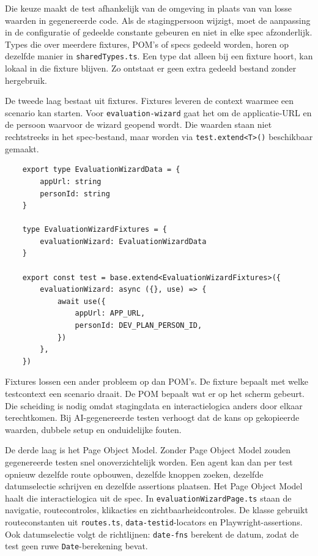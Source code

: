 Die keuze maakt de test afhankelijk van de omgeving in plaats van van losse waarden in gegenereerde code. Als de stagingpersoon wijzigt, moet de aanpassing in de configuratie of gedeelde constante gebeuren en niet in elke spec afzonderlijk. Types die over meerdere fixtures, POM's of specs gedeeld worden, horen op dezelfde manier in \texttt{sharedTypes.ts}. Een type dat alleen bij een fixture hoort, kan lokaal in die fixture blijven. Zo ontstaat er geen extra gedeeld bestand zonder hergebruik.

De tweede laag bestaat uit fixtures. Fixtures leveren de context waarmee een scenario kan starten. Voor \texttt{evaluation-wizard} gaat het om de applicatie-URL en de persoon waarvoor de wizard geopend wordt. Die waarden staan niet rechtstreeks in het spec-bestand, maar worden via \texttt{test.extend<T>()} beschikbaar gemaakt.

\begin{verbatim}
    export type EvaluationWizardData = {
        appUrl: string
        personId: string
    }
    
    type EvaluationWizardFixtures = {
        evaluationWizard: EvaluationWizardData
    }
    
    export const test = base.extend<EvaluationWizardFixtures>({
        evaluationWizard: async ({}, use) => {
            await use({
                appUrl: APP_URL,
                personId: DEV_PLAN_PERSON_ID,
            })
        },
    })
\end{verbatim}

Fixtures lossen een ander probleem op dan POM's. De fixture bepaalt met welke testcontext een scenario draait. De POM bepaalt wat er op het scherm gebeurt. Die scheiding is nodig omdat stagingdata en interactielogica anders door elkaar terechtkomen. Bij AI-gegenereerde testen verhoogt dat de kans op gekopieerde waarden, dubbele setup en onduidelijke fouten.

De derde laag is het Page Object Model. Zonder Page Object Model zouden gegenereerde testen snel onoverzichtelijk worden. Een agent kan dan per test opnieuw dezelfde route opbouwen, dezelfde knoppen zoeken, dezelfde datumselectie schrijven en dezelfde assertions plaatsen. Het Page Object Model haalt die interactielogica uit de spec. In \texttt{evaluationWizardPage.ts} staan de navigatie, routecontroles, klikacties en zichtbaarheidcontroles. De klasse gebruikt routeconstanten uit \texttt{routes.ts}, \texttt{data-testid}-locators en Playwright-assertions. Ook datumselectie volgt de richtlijnen: \texttt{date-fns} berekent de datum, zodat de test geen ruwe \texttt{Date}-berekening bevat.

